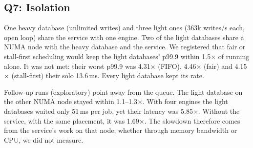\documentclass[sigconf, nonacm]{acmart}
\begin{document}
\subsection{Q7: Isolation}
\label{sec:eval-isolation}
One heavy database (unlimited writes) and three light ones (363k writes/s each, open loop)
share the service with one engine. Two of the light databases share a NUMA node with the heavy
database and the service. We registered that fair or stall-first scheduling would keep the
light databases' p99.9 within 1.5$\times$ of running alone. It was not met: their worst p99.9
was 4.31$\times$ (FIFO), 4.46$\times$ (fair) and 4.15$\times$ (stall-first) their solo 13.6\,ms.
Every light database kept its rate.

Follow-up runs (exploratory) point away from the queue. The light database on the other NUMA
node stayed within 1.1--1.3$\times$. With four engines the light databases waited only 51\,ms
per job, yet their latency was 5.85$\times$. Without the service, with the same placement, it
was 1.69$\times$. The slowdown therefore comes from the service's work on that node; whether
through memory bandwidth or CPU, we did not measure.

\end{document}
